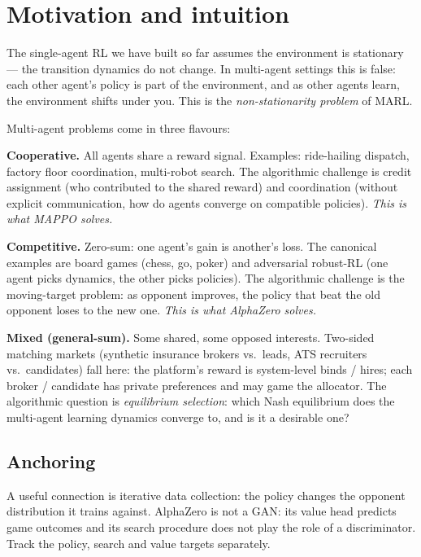 \documentclass[11pt,oneside]{scrbook}
\begin{document}
\chapter{Motivation and intuition}

The single-agent RL we have built so far assumes the environment is
stationary --- the transition dynamics do not change. In multi-agent
settings this is false: each other agent's policy is part of the
environment, and as other agents learn, the environment shifts under you.
This is the \emph{non-stationarity problem} of MARL.

Multi-agent problems come in three flavours:

\textbf{Cooperative.} All agents share a reward signal. Examples:
ride-hailing dispatch, factory floor coordination, multi-robot search.
The algorithmic challenge is credit assignment (who contributed to the
shared reward) and coordination (without explicit communication, how do
agents converge on compatible policies). \emph{This is what MAPPO solves.}

\textbf{Competitive.} Zero-sum: one agent's gain is another's loss. The
canonical examples are board games (chess, go, poker) and adversarial
robust-RL (one agent picks dynamics, the other picks policies). The
algorithmic challenge is the moving-target problem: as opponent improves,
the policy that beat the old opponent loses to the new one.
\emph{This is what AlphaZero solves.}

\textbf{Mixed (general-sum).} Some shared, some opposed interests. Two-sided
matching markets (synthetic insurance brokers vs.\ leads, ATS recruiters vs.\
candidates) fall here: the platform's reward is system-level binds /
hires; each broker / candidate has private preferences and may game the
allocator. The algorithmic question is \emph{equilibrium selection}: which
Nash equilibrium does the multi-agent learning dynamics converge to, and
is it a desirable one?

\section{Anchoring}

A useful connection is iterative data collection: the policy changes the
opponent distribution it trains against. AlphaZero is not a GAN: its value
head predicts game outcomes and its search procedure does not play the role
of a discriminator. Track the policy, search and value targets separately.
\end{document}
